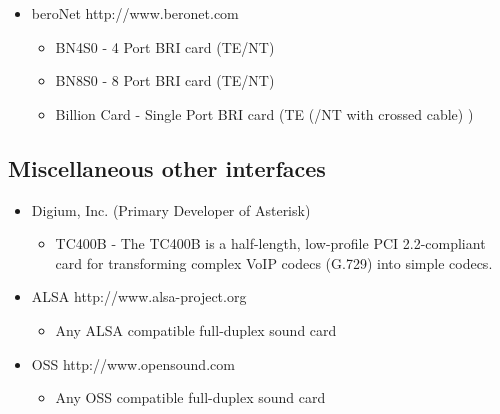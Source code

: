 \begin{itemize}
  \item beroNet 
  http://www.beronet.com
  \begin{itemize}
    \item BN4S0 - 4 Port BRI card (TE/NT)

    \item BN8S0 - 8 Port BRI card (TE/NT)

    \item Billion Card - Single Port BRI card (TE (/NT with crossed cable) )
   \end{itemize}
\end{itemize}

\subsection{Miscellaneous other interfaces}

\begin{itemize}
  \item Digium, Inc. (Primary Developer of Asterisk)
  \begin{itemize}
    \item TC400B - The TC400B is a half-length, low-profile PCI 2.2-compliant card for transforming complex VoIP codecs (G.729) into simple codecs.
  \end{itemize}

  \item ALSA
        http://www.alsa-project.org
  \begin{itemize}
    \item Any ALSA compatible full-duplex sound card
  \end{itemize}

  \item OSS
        http://www.opensound.com
  \begin{itemize}
    \item Any OSS compatible full-duplex sound card
  \end{itemize}
\end{itemize}
